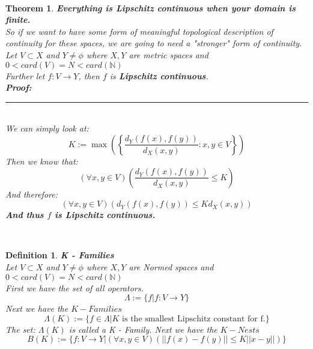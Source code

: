 \documentclass[12pt]{extarticle}
\theoremstyle{plain}
\newtheorem{thm}{Theorem}[section]
\theoremstyle{plain}
\theoremstyle{plain}
\theoremstyle{Definition}
\newtheorem{def.}{Definition}[section]
\theoremstyle{Definition}
\theoremstyle{plain}
\newcommand{\cut}[0]{\noindent\framebox[\linewidth]{\rule{\linewidth}{2pt}}\\}
\newcommand{\prof}[0]{	\noindent \textbf{Proof:} \rule{500pt}{2pt} \\ }
\begin{document}
	\cut
	\begin{thm} \textbf{Everything is Lipschitz continuous when your domain is finite.} \\
		So if we want to have some form of meaningful topological description of continuity for these spaces, we are going to need a "stronger" form of continuity. \\
		Let $V \subset X$ and $Y \not = \phi$ where $X,Y$ are metric spaces and $0 < card(V) = N < card(\mathbb{N})$ \\
		Further let $f : V \to Y$, then $f$ is \textbf{Lipschitz continuous}. \\
		\prof
		We can simply look at: \\
		$$K := \max\left( \left\{\frac{d_Y(f(x),f(y))}{d_X(x,y)} : x,y \in V \right\} \right)$$
		Then we know that: 
		$$(\forall x,y \in V)\left( \frac{d_Y(f(x),f(y))}{d_X(x,y)} \leq K\right)$$
		And therefore: \\ 
		$$(\forall x,y \in V)\left( d_Y(f(x),f(y)) \leq Kd_X(x,y)\right)$$
		\textbf{And thus $f$ is Lipschitz continuous.} \\ 
	\end{thm}
	\cut
	\begin{def.} \textbf{K - Families} \\ 
		Let $V \subset X$ and $Y \not = \phi$ where $X,Y$ are Normed spaces and $0 < card(V) = N < card(\mathbb{N})$ \\
		First we have the set of all operators.  
		$$\Lambda := \{f | f : V \to Y\}$$
		Next we have the $K - Families$ 
		$$\Lambda(K) := \{f \in \Lambda | K \text{ is the smallest Lipschitz constant for f.}\}$$
		The set: $\Lambda(K)$ is called a K - Family. 
		Next we have the $K - Nests$ 
		$$B(K) := \{f : V \to Y | (\forall x,y \in V) (||f(x) - f(y)|| \leq K ||x - y||)\}$$
	\end{def.}
	\cut
\end{document}
